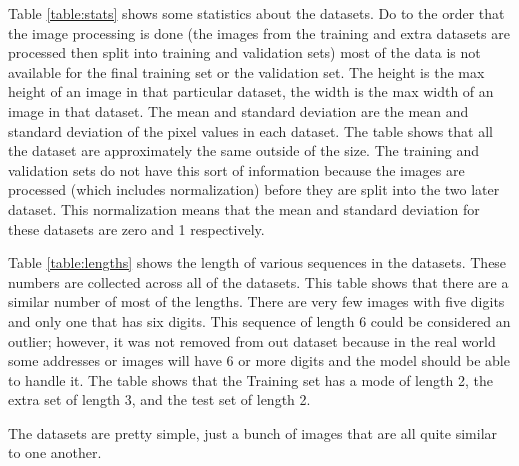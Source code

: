 \documentclass[12pt,twocolumn,letterpaper]{article}
\begin{document}
Table \ref{table:stats} shows some statistics about the datasets. Do to the order that the image
processing is done (the images from the training and extra datasets are 
processed then split into training and validation sets) most of the data is not 
available for the final training set or the validation set. The height is the max 
height of an image in that particular dataset, the width is the max width of an 
image in that dataset. The mean and standard deviation are the mean and standard 
deviation of the pixel values in each dataset. The table shows that all the 
dataset are approximately the same outside of the size. The training and 
validation sets do not have this sort of information because the images are 
processed (which includes normalization) before they are split into the two later 
dataset. This normalization means that the mean and standard deviation for these
datasets are zero and 1 respectively.

Table \ref{table:lengths} shows the length of various sequences in the datasets. These numbers are 
collected across all of the datasets. This table shows that there are a similar 
number of most of the lengths. There are very few images with five digits and 
only one that has six digits. This sequence of length 6 could be considered an 
outlier; however, it was not removed from out dataset because in the real world 
some addresses or images will have 6 or more digits and the model should be 
able to handle it. The table shows that the Training set has a mode of length 2,
the extra set of length 3, and the test set of length 2.

The datasets are pretty simple, just a bunch of images that are all quite similar 
to one another.
\end{document}
